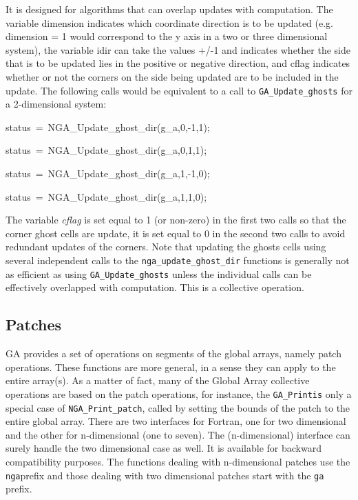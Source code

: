 It is designed for algorithms that can overlap updates with computation.
The variable dimension indicates which coordinate direction is to
be updated (e.g. dimension = 1 would correspond to the y axis in a
two or three dimensional system), the variable idir can take the values
+/-1 and indicates whether the side that is to be updated lies in
the positive or negative direction, and cflag indicates whether or
not the corners on the side being updated are to be included in the
update. The following calls would be equivalent to a call to \texttt{GA\_Update\_ghosts}
for a 2-dimensional system:
\begin{lyxcode}
status~=~NGA\_Update\_ghost\_dir(g\_a,0,-1,1);~

status~=~NGA\_Update\_ghost\_dir(g\_a,0,1,1);~

status~=~NGA\_Update\_ghost\_dir(g\_a,1,-1,0);~

status~=~NGA\_Update\_ghost\_dir(g\_a,1,1,0);
\end{lyxcode}
The variable \emph{cflag} is set equal to 1 (or non-zero) in the first
two calls so that the corner ghost cells are update, it is set equal
to 0 in the second two calls to avoid redundant updates of the corners.
Note that updating the ghosts cells using several independent calls
to the \texttt{nga\_update\_ghost\_dir} functions is generally not
as efficient as using \texttt{GA\_Update\_ghosts} unless the individual
calls can be effectively overlapped with computation. This is a collective
operation. 


\subsection{Patches }

GA provides a set of operations on segments of the global arrays,
namely patch operations. These functions are more general, in a sense
they can apply to the entire array(s). As a matter of fact, many of
the Global Array collective operations are based on the patch operations,
for instance, the \texttt{GA\_Printis} only a special case of \texttt{NGA\_Print\_patch},
called by setting the bounds of the patch to the entire global array.
There are two interfaces for Fortran, one for two dimensional and
the other for n-dimensional (one to seven). The (n-dimensional) interface
can surely handle the two dimensional case as well. It is available
for backward compatibility purposes. The functions dealing with n-dimensional
patches use the \textquotedbl{}\texttt{nga}\textquotedbl{}prefix and
those dealing with two dimensional patches start with the \textquotedbl{}\texttt{ga}\textquotedbl{}
prefix.

